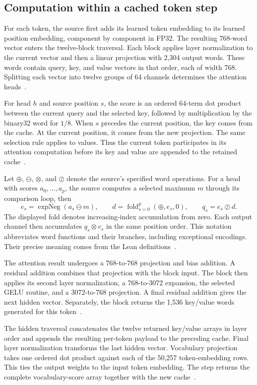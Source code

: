\subsection{Computation within a cached token step}

For each token, the source first adds its learned token embedding to its learned position embedding, component by component in FP32.  The resulting 768-word vector enters the twelve-block traversal.  Each block applies layer normalization to the current vector and then a linear projection with 2,304 output words.  These words contain query, key, and value vectors in that order, each of width 768.  Splitting each vector into twelve groups of 64 channels determines the attention heads~\cite{cached}.

For head $h$ and source position $s$, the score is an ordered 64-term dot product between the current query and the selected key, followed by multiplication by the binary32 word for $1/8$.  When $s$ precedes the current position, the key comes from the cache.  At the current position, it comes from the new projection.  The same selection rule applies to values.  Thus the current token participates in its attention computation before its key and value are appended to the retained cache~\cite{cached}.

Let $\oplus$, $\ominus$, $\otimes$, and $\oslash$ denote the source's specified word operations.  For a head with scores $a_0,\ldots,a_p$, the source computes a selected maximum $m$ through its comparison loop, then
\[
e_s=\operatorname{expNeg}(a_s\ominus m),\qquad
d=\operatorname{fold}_{s=0}^{p}(\oplus,e_s,0),\qquad
q_s=e_s\oslash d.
\]
The displayed fold denotes increasing-index accumulation from zero.  Each output channel then accumulates $q_s\otimes v_s$ in the same position order.  This notation abbreviates word functions and their branches, including exceptional encodings.  Their precise meaning comes from the Lean definitions~\cite{cached,numerics}.

The attention result undergoes a 768-to-768 projection and bias addition.  A residual addition combines that projection with the block input.  The block then applies its second layer normalization, a 768-to-3072 expansion, the selected GELU routine, and a 3072-to-768 projection.  A final residual addition gives the next hidden vector.  Separately, the block returns the 1,536 key/value words generated for this token~\cite{cached,kernels}.

The hidden traversal concatenates the twelve returned key/value arrays in layer order and appends the resulting per-token payload to the preceding cache.  Final layer normalization transforms the last hidden vector.  Vocabulary projection takes one ordered dot product against each of the 50,257 token-embedding rows.  This ties the output weights to the input token embedding.  The step returns the complete vocabulary-score array together with the new cache~\cite{cached,gpt2}.

